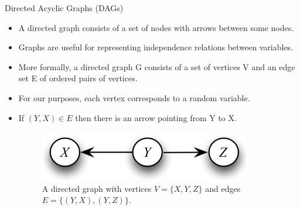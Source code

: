 \documentclass[handout]{beamer}
\begin{document}
\begin{frame}{Directed Acyclic Graphs (DAGs)}
\scriptsize{
\begin{itemize}
\item A directed graph consists of a set of nodes with arrows between some nodes.


\item Graphs are useful for representing independence relations between variables.

\item More formally, a directed graph G consists of a set of vertices V and an edge set E of ordered pairs of
vertices.

\item For our purposes, each vertex corresponds to a random variable. 

\item If $(Y, X) \in E$  then there is an arrow pointing from Y to X. 

\begin{figure}[h!]
	\centering
	\includegraphics[scale=0.5]{pics/dag1.png}
	\caption{A directed graph with vertices $V = \{X, Y, Z\}$ and edges $E = \{(Y, X), (Y, Z)\}$.}
	\end{figure} 


 
\end{itemize}



} 

\end{frame}
\end{document}
